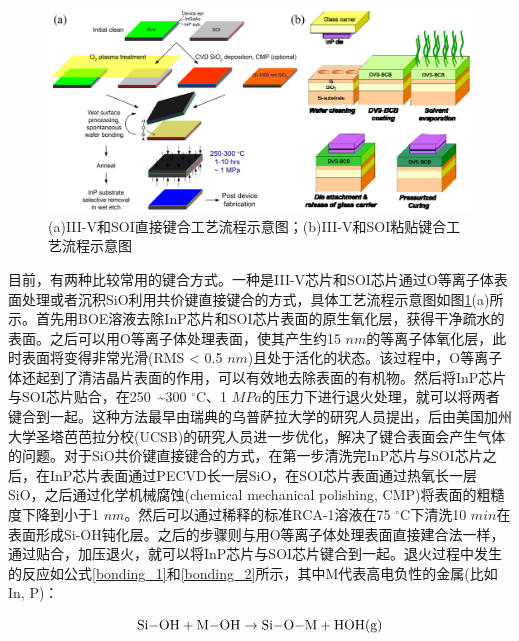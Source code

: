 \begin{figure}[htb]
	\centering
	\includegraphics[width=14cm]{./Pictures/laser_bonding.jpg}
	\captionsetup{justification=centering}
	\caption{(a)III-V和SOI直接键合工艺流程示意图\cite{liang2010hybrid}；(b)III-V和SOI粘贴键合工艺流程示意图\cite{liang2010hybrid}}
	\label{laser_bonding}
\end{figure}

目前，有两种比较常用的键合方式。一种是III-V芯片和SOI芯片通过O等离子体表面处理或者沉积SiO利用共价键直接键合的方式，具体工艺流程示意图如图\ref{laser_bonding}(a)所示。首先用BOE溶液去除InP芯片和SOI芯片表面的原生氧化层，获得干净疏水的表面。之后可以用O等离子体处理表面，使其产生约15 $nm$的等离子体氧化层，此时表面将变得非常光滑(RMS < 0.5 $nm$)且处于活化的状态。该过程中，O等离子体还起到了清洁晶片表面的作用，可以有效地去除表面的有机物。然后将InP芯片与SOI芯片贴合，在250~\~{}300 $^{\circ}$C、1 $MPa$的压力下进行退火处理，就可以将两者键合到一起。这种方法最早由瑞典的乌普萨拉大学的研究人员提出\cite{pasquariello2002plasma}，后由美国加州大学圣塔芭芭拉分校(UCSB)的研究人员进一步优化\cite{liang2010hybrid}，解决了键合表面会产生气体的问题。对于SiO共价键直接键合的方式，在第一步清洗完InP芯片与SOI芯片之后，在InP芯片表面通过PECVD长一层SiO，在SOI芯片表面通过热氧长一层SiO，之后通过化学机械腐蚀(chemical mechanical polishing, CMP)将表面的粗糙度下降到小于1 $nm$。然后可以通过稀释的标准RCA-1溶液在75 $^{\circ}$C下清洗10 $min$在表面形成Si-OH钝化层。之后的步骤则与用O等离子体处理表面直接建合法一样，通过贴合，加压退火，就可以将InP芯片与SOI芯片键合到一起。退火过程中发生的反应如公式\ref{bonding_1}和\ref{bonding_2}所示\cite{liang2010hybrid}，其中M代表高电负性的金属(比如In, P)：

\begin{equation}
\label{bonding_1}
\rm \ce{Si-OH} + \ce{M-OH} \rightarrow \ce{Si-O-M} +HOH(g)
\end{equation}

